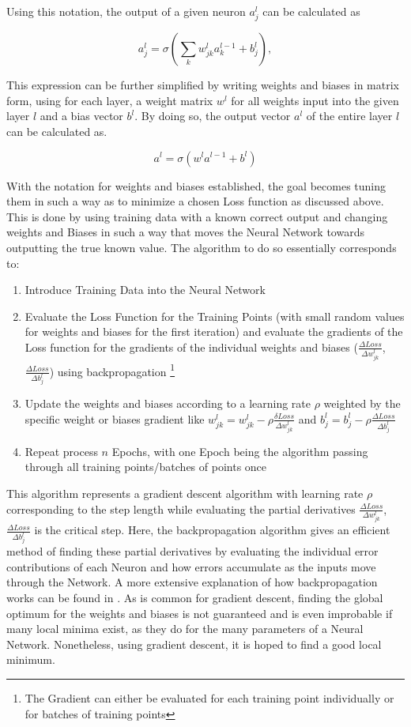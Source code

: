  Using this notation, the output of a given neuron $a_j^l$ can be calculated as 
 
 $$
 a_j^l = \sigma\left( \sum_k w_{jk}^l a_k^{l-1} + b_j^l \right),
 $$
 
 This expression can be further simplified by writing weights and biases in matrix form, using for each layer, a weight matrix $w^l$ for all weights input into the given layer $l$ and a bias vector $b^l$. By doing so, the output vector $a^l$ of the entire layer $l$ can be calculated as.
 
 $$a^l = \sigma (w^la^{l-1}+b^l)$$
 
With the notation for weights and biases established, the goal becomes tuning them in such a way as to minimize a chosen Loss function as discussed above. This is done by using training data with a known correct output and changing weights and Biases in such a way that moves the Neural Network towards outputting the true known value. 
The algorithm to do so essentially corresponds to: 

\begin{enumerate}
	\item Introduce Training Data into the Neural Network
	\item Evaluate the Loss Function for the Training Points (with small random values for weights and biases for the first iteration) and evaluate the gradients of the Loss function for the gradients of the individual weights and biases ($\frac{\Delta Loss}{\Delta w_{jk}^l}$, $\frac{\Delta Loss}{\Delta b_j^l}$) using backpropagation  \footnote{The Gradient can either be evaluated for each training point individually or for batches of training points}
	\item Update the weights and biases according to a learning rate $\rho$ weighted by the specific weight or biases gradient like $w_{jk}^l =w_{jk}^l - \rho \frac{\delta Loss}{\Delta w_{jk}^l}$ and $b_j^l =b_j^l - \rho \frac{\Delta Loss}{\Delta b_j^l}$ 
	\item Repeat process $n$ Epochs, with one Epoch being the algorithm passing through all training points/batches of points once
\end{enumerate}

This algorithm represents a gradient descent algorithm with learning rate  $\rho$ corresponding to the step length while evaluating the partial derivatives $\frac{\Delta Loss}{\Delta w_{jk}^l}$, $\frac{\Delta Loss}{\Delta b_j^l}$ is the critical step. Here, the backpropagation algorithm gives an efficient method of finding these partial derivatives by evaluating the individual error contributions of each Neuron and how errors accumulate as the inputs move through the Network. A more extensive explanation of how backpropagation works can be found in \cite{nielsen2015neuralChap2}. As is common for gradient descent, finding the global optimum for the weights and biases is not guaranteed and is even improbable if many local minima exist, as they do for the many parameters of a Neural Network. Nonetheless, using gradient descent, it is hoped to find a good local minimum. \cite{James2023} \cite{nielsen2015neuralChap2}

